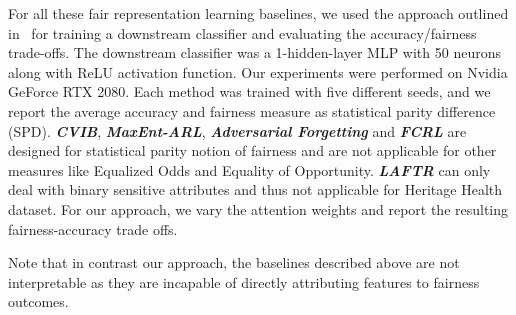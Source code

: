 For all these fair representation learning  baselines, we used the approach outlined in~\cite{gupta2021controllable} for training a downstream classifier and evaluating the accuracy/fairness trade-offs. The downstream classifier was a 1-hidden-layer MLP with 50 neurons along with ReLU activation function. Our experiments were performed on Nvidia GeForce RTX 2080. Each method was trained with five different seeds, and we report the average accuracy and fairness measure as statistical parity difference (SPD). \textit{\textbf{CVIB}}, \textit{\textbf{MaxEnt-ARL}}, \textit{\textbf{Adversarial Forgetting}} and \textit{\textbf{FCRL}} are designed for statistical parity notion of fairness and are not applicable for other measures like Equalized Odds and Equality of Opportunity.  \textit{\textbf{LAFTR}} can only deal with binary sensitive attributes and thus not applicable for Heritage Health dataset. For our approach, we vary the attention weights and report the resulting fairness-accuracy trade offs.  

Note that in contrast our approach,  the baselines described above are not interpretable as they  are incapable of directly attributing features to fairness outcomes.














